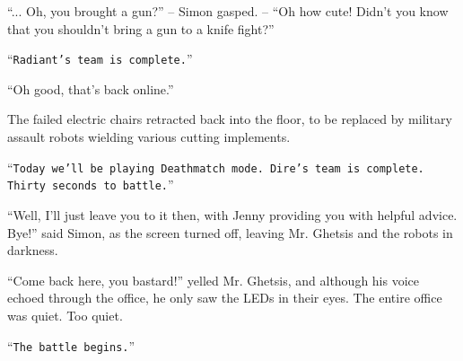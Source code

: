 \documentclass[10pt,a4paper]{article}
\newcommand{\lang}[2]{ #2 \par}
\newcommand{\ai}[2]{
	\lang{
		-- \texttt{#1}
	}{
		``\texttt{#2}''
	}
}
\newcommand{\ainame}{Jenny}
\newcommand{\mainname}{Simon}
\newcommand{\policename}{Mr. Ghetsis}
\begin{document}
\lang{...}{``... Oh, you brought a gun?'' -- \mainname{} gasped. -- ``Oh how cute! Didn't you know that you shouldn't bring a gun to a knife fight?''}
\ai{...}{Radiant's team is complete.}
\lang{...}{``Oh good, that's back online.''}
\lang{...}{The failed electric chairs retracted back into the floor, to be replaced by military assault robots wielding various cutting implements.}
\ai{...}{Today we'll be playing Deathmatch mode. Dire's team is complete. Thirty seconds to battle.}
\lang{...}{``Well, I'll just leave you to it then, with \ainame{} providing you with helpful advice. Bye!'' said \mainname{}, as the screen turned off, leaving \policename{} and the robots in darkness.}
\lang{}{``Come back here, you bastard!'' yelled \policename{}, and although his voice echoed through the office, he only saw the LEDs in their eyes. The entire office was quiet. Too quiet.}
\ai{...}{The battle begins.}
\end{document}
